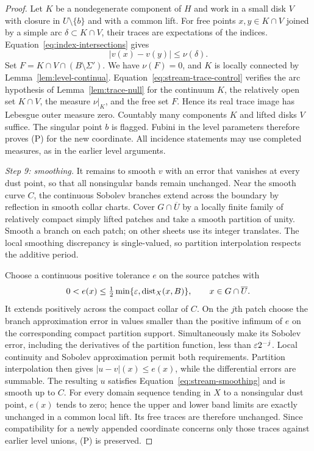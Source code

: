 \begin{proof}
Let $K$ be a nondegenerate component of $H$ and work in a small disk
$V$ with closure in $U\setminus\{b\}$ and with a common lift.
For free points $x,y\in K\cap V$ joined by a simple arc
$\delta\subset K\cap V$, their traces are expectations of the
indices.  Equation~\eqref{eq:index-intersections} gives
\begin{equation}\label{eq:stream-trace-control}
 |v(x)-v(y)|\le\nu(\delta).
\end{equation}
Set $F=K\cap V\cap(B\setminus\Sigma')$.  We have $\nu(F)=0$,
and $K$ is locally connected by Lemma~\ref{lem:level-continua}.
Equation~\eqref{eq:stream-trace-control} verifies the arc hypothesis
of Lemma~\ref{lem:trace-null} for the continuum $K$, the relatively
open set $K\cap V$, the measure $\nu|_K$, and the free set $F$.
Hence its real trace image has Lebesgue outer measure zero.
Countably many components $K$ and lifted disks $V$ suffice.
The singular point $b$ is flagged.  Fubini in the level parameters
therefore proves (P) for the new coordinate.  All incidence statements
may use completed measures, as in the earlier level arguments.

\smallskip\noindent\emph{Step 9: smoothing.}
It remains to smooth $v$ with an error that vanishes at every dust
point, so that all nonsingular bands remain unchanged.
Near the smooth curve $C$, the continuous Sobolev branches extend
across the boundary by reflection in smooth collar charts.  Cover
$G\cap\overline U$ by a locally finite family of relatively compact
simply lifted patches and take a smooth partition of unity.  Smooth a
branch on each patch; on other sheets use its integer translates.
The local smoothing discrepancy is single-valued, so partition
interpolation respects the additive period.

Choose a continuous positive tolerance $e$ on the source patches with
\[
 0<e(x)\le\tfrac12\min\{\varepsilon,\operatorname{dist}_X(x,B)\},
 \qquad x\in G\cap\overline U.
\]
It extends positively across the compact collar of $C$.  On the $j$th
patch choose the branch approximation error in values smaller than
the positive infimum of $e$ on the corresponding compact partition
support.  Simultaneously make its Sobolev error, including the
derivatives of the partition function, less than $\varepsilon2^{-j}$.
Local continuity and Sobolev approximation permit both requirements.
Partition interpolation then gives $|u-v|(x)\le e(x)$, while the
differential errors are summable.  The resulting $u$ satisfies
Equation~\eqref{eq:stream-smoothing} and is smooth up to $C$.
For every domain sequence tending in $X$ to a nonsingular dust point,
$e(x)$ tends to zero; hence the upper and lower band limits are
exactly unchanged in a common local lift.  Its free traces are
therefore unchanged.  Since compatibility for a newly appended
coordinate concerns only those traces against earlier level unions,
(P) is preserved.
\end{proof}

